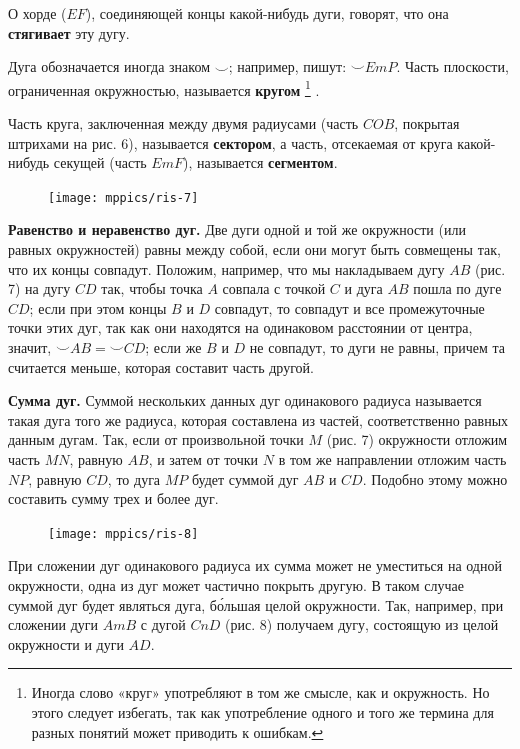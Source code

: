 \documentclass[oneside]{book}
\begin{document}
О хорде ($EF$), соединяющей концы какой-нибудь дуги, говорят, что она \textbf{стягивает} эту дугу.

Дуга обозначается иногда знаком $\smallsmile$;
например, пишут: ${\smallsmile} EmP$.
Часть плоскости, ограниченная окружностью, называется \textbf{кругом}%
\footnote{Иногда слово «круг» употребляют в том же смысле, как и окружность.
Но этого следует избегать, так как употребление одного и того же термина для разных понятий может приводить к ошибкам.}%
.

Часть круга, заключенная между двумя радиусами (часть $COB$, покрытая штрихами на рис. 6), называется \textbf{сектором}, а часть, отсекаемая от круга какой-нибудь секущей (часть $EmF$), называется \textbf{сегментом}.

\begin{figure}
\texttt{[image: mppics/ris-7]}
\caption{}
\end{figure}

\textbf{Равенство и неравенство дуг.}
Две дуги одной и той же окружности (или равных окружностей) равны между собой, если они могут быть совмещены так, что их концы совпадут.
Положим, например, что мы накладываем дугу $AB$ (рис. 7) на дугу $CD$ так, чтобы точка $A$ совпала с точкой $C$ и дуга $AB$ пошла по дуге $CD$;
если при этом концы $B$ и $D$ совпадут, то совпадут и все промежуточные точки этих дуг, так как они находятся на одинаковом расстоянии от центра, значит, ${\smallsmile} AB={\smallsmile} CD$;
если же $B$ и $D$ не совпадут, то дуги не равны, причем та считается меньше, которая составит часть другой.

\textbf{Сумма дуг.}
Суммой нескольких данных дуг одинакового радиуса называется такая дуга того же радиуса, которая составлена из частей, соответственно равных данным дугам.
Так, если от произвольной точки $M$ (рис. 7) окружности отложим часть $MN$, равную $AB$, и затем от точки $N$ в том же направлении отложим часть $NP$, равную $CD$, то дуга $MP$ будет суммой дуг $AB$ и $CD$.
Подобно этому можно составить сумму трех и более дуг.

\begin{figure}[h]
\begin{center}
\texttt{[image: mppics/ris-8]}
\caption{}
\end{center}
\end{figure}

При сложении дуг одинакового радиуса их сумма может не уместиться на одной окружности, одна из дуг может частично покрыть другую.
В таком случае суммой дуг будет являться дуга, б\'{о}льшая целой окружности.
Так, например, при сложении дуги $AmB$ с дугой $CnD$ (рис. 8) получаем дугу, состоящую из целой окружности и дуги $AD$.
\end{document}
